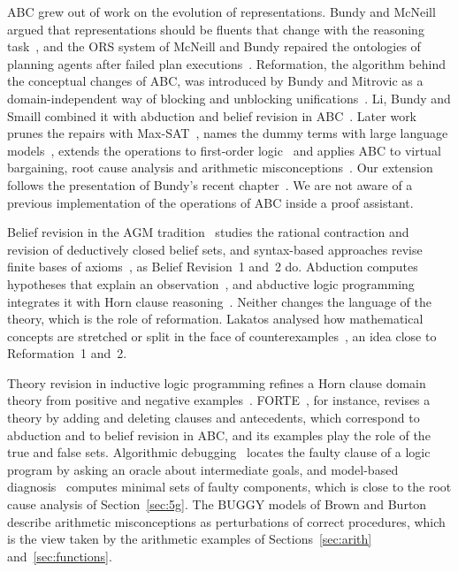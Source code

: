 \documentclass[preprint,12pt]{elsarticle}
\begin{document}
ABC grew out of work on the evolution of representations. Bundy and McNeill
argued that representations should be fluents that change with the
reasoning task~\cite{BundyMcNeill06}, and the ORS system of McNeill and
Bundy repaired the ontologies of planning agents after failed plan
executions~\cite{McNeillBundy07}. Reformation, the algorithm behind the
conceptual changes of ABC, was introduced by Bundy and Mitrovic as a
domain-independent way of blocking and unblocking
unifications~\cite{BundyMitrovic16}. Li, Bundy and Smaill combined it with
abduction and belief revision in ABC~\cite{LiBundySmaill18,Li21}. Later
work prunes the repairs with Max-SAT~\cite{Urbonas20}, names the dummy
terms with large language models~\cite{ChanLiBundy23}, extends the
operations to first-order logic~\cite{WongLiBundy24} and applies ABC to
virtual bargaining, root cause analysis and arithmetic
misconceptions~\cite{BundyPhilalithisLi20,LiEtAl22,Tang16}. Our extension
follows the presentation of Bundy's recent chapter~\cite{Bundy26}. We are
not aware of a previous implementation of the operations of ABC inside a
proof assistant.

Belief revision in the AGM tradition~\cite{AGM85} studies the rational
contraction and revision of deductively closed belief sets, and
syntax-based approaches revise finite bases of axioms~\cite{Nebel91}, as
Belief Revision~1 and~2 do. Abduction computes hypotheses that explain an
observation~\cite{CoxPietrzykowski86}, and abductive logic programming
integrates it with Horn clause reasoning~\cite{KakasKowalskiToni92}.
Neither changes the language of the theory, which is the role of
reformation. Lakatos analysed how mathematical concepts are stretched or
split in the face of counterexamples~\cite{Lakatos76}, an idea close to
Reformation~1 and~2.

Theory revision in inductive logic programming refines a Horn clause
domain theory from positive and negative examples~\cite{MuggletonDeRaedt94}.
FORTE~\cite{RichardsMooney95}, for instance, revises a theory by adding and
deleting clauses and antecedents, which correspond to abduction and to
belief revision in ABC, and its examples play the role of the true and
false sets. Algorithmic debugging~\cite{Shapiro83} locates the faulty
clause of a logic program by asking an oracle about intermediate goals,
and model-based diagnosis~\cite{Reiter87} computes minimal sets of faulty
components, which is close to the root cause analysis of
Section~\ref{sec:5g}. The BUGGY models of Brown and Burton~\cite{BrownBurton78}
describe arithmetic misconceptions as perturbations of correct procedures,
which is the view taken by the arithmetic examples of
Sections~\ref{sec:arith} and~\ref{sec:functions}.
\end{document}
